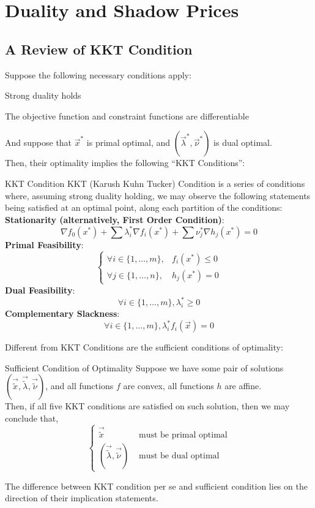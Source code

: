 \chapter{Duality and Shadow Prices}

\section{A Review of KKT Condition}
Suppose the following necessary conditions apply:
\begin{bindenum}
    \item Strong duality holds
    \item The objective function and constraint functions are differentiable
\end{bindenum}
And suppose that $\vec{x}^*$ is primal optimal, and $(\vec{\lambda}^*, \vec{\nu}^*)$ is dual optimal. \\
Then, their optimality implies the following ``KKT Conditions'':
\begin{ln-define}{KKT Condition}{}
    KKT (Karush Kuhn Tucker) Condition is a series of conditions where, assuming strong duality holding, we may observe the following statements being satisfied at an optimal point, along each partition of the conditions: \\
    \textbf{Stationarity (alternatively, First Order Condition)}:
    \[
        \nabla f_0(x^*) + \sum \lambda_i^* \nabla {f_i(x^*)} + \sum \nu_j^* \nabla h_j (x^*) = 0
    \]
    \textbf{Primal Feasibility}:
    \[
        \begin{cases}
            \forall i \in \{1, \dots, m\}, &f_i(x^*) \leq 0 \\
            \forall j \in \{1, \dots, n\}, &h_j(x^*) = 0
        \end{cases}
    \]
    \textbf{Dual Feasibility}:
    \[
        \forall i \in \{1, \dots, m\}, \lambda_i^* \geq 0
    \]
    \textbf{Complementary Slackness}:
    \[
        \forall i \in \{1, \dots, m\}, \lambda_i^* f_i(\vec{x}) = 0
    \]
\end{ln-define}

Different from KKT Conditions are the sufficient conditions of optimality:
\begin{ln-define}{Sufficient Condition of Optimality}{}
    Suppose we have some pair of solutions $(\vec{\tilde{x}}, \vec{\tilde{\lambda}}, \vec{\tilde{\nu}})$, and all functions $f$ are convex, all functions $h$ are affine. \\
    Then, if all five KKT conditions are satisfied on such solution, then we may conclude that,
    \[
        \begin{cases}
            \vec{\tilde{x}} &\text{ must be primal optimal} \\
            (\vec{\tilde{\lambda}}, \vec{\tilde{\nu}}) &\text{ must be dual optimal}
        \end{cases}
    \]
\end{ln-define}
The difference between KKT condition per se and sufficient condition lies on the direction of their implication statements.

